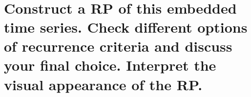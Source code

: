 \documentclass[11pt]{article}
\begin{document}
    \begin{center}
    \end{center}
    { \hspace*{\fill} \\}
    
    \hypertarget{construct-a-rp-of-this-embedded-time-series.-check-different-options-of-recurrence-criteria-and-discuss-your-final-choice.-interpret-the-visual-appearance-of-the-rp.}{%
\section{Construct a RP of this embedded time series. Check different
options of recurrence criteria and discuss your final choice. Interpret
the visual appearance of the
RP.}\label{construct-a-rp-of-this-embedded-time-series.-check-different-options-of-recurrence-criteria-and-discuss-your-final-choice.-interpret-the-visual-appearance-of-the-rp.}}
\end{document}
